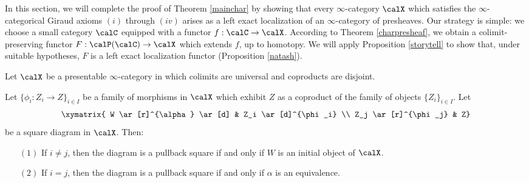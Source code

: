 In this section, we will complete the proof of Theorem \ref{mainchar} by showing that every $\infty$-category $\calX$ which satisfies the $\infty$-categorical Giraud axioms $(i)$ through $(iv)$ arises as a left exact localization of an $\infty$-category of presheaves. Our strategy is simple: we choose a small category $\calC$ equipped with a functor $f: \calC \rightarrow \calX$. According to Theorem \ref{charpresheaf}, we obtain a colimit-preserving functor $F: \calP(\calC) \rightarrow \calX$ which extends $f$, up to homotopy. We will apply Proposition \ref{storytell} to show that, under suitable hypotheses, $F$ is a left exact localization functor (Proposition \ref{natash}). 

\begin{lemma}\label{sumdescription}
Let $\calX$ be a presentable $\infty$-category in which colimits are universal and coproducts are disjoint.

Let $\{ \phi_i: Z_i \rightarrow Z\}_{i \in I}$ be a family of morphisms in $\calX$ which exhibit $Z$ as a coproduct of the family of objects $\{Z_i\}_{i \in I}$. Let
$$ \xymatrix{ W \ar[r]^{\alpha} \ar[d] & Z_i \ar[d]^{\phi_i} \\
Z_j \ar[r]^{\phi_j} & Z}$$ be a square diagram in $\calX$. Then:
\begin{itemize}
\item[$(1)$] If $i \neq j$, then the diagram is a pullback square if and only if $W$ is an initial object of $\calX$.
\item[$(2)$] If $i = j$, then the diagram is a pullback square if and only if $\alpha$
is an equivalence.
\end{itemize}
\end{lemma}

